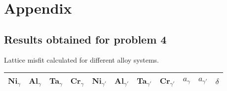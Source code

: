 \newpage
\section{Appendix}
\label{appendix}

\subsection{Results obtained for problem 4}

Lattice misfit calculated for different alloy systems. 

\begin{table}[H]
    \centering
    \begin{tabular}{rrrrrrrrrrr}
        \multicolumn{1}{c}{Ni$_\gamma$} & \multicolumn{1}{c}{Al$_\gamma$} & \multicolumn{1}{c}{Ta$_\gamma$} & \multicolumn{1}{c}{Cr$_\gamma$} & \multicolumn{1}{c}{Ni$_{\gamma'}$} & \multicolumn{1}{c}{Al$_{\gamma'}$} & \multicolumn{1}{c}{Ta$_{\gamma'}$} & \multicolumn{1}{c}{Cr$_{\gamma'}$} & \multicolumn{1}{c}{$a_\gamma$} & \multicolumn{1}{c}{$a_{\gamma'}$} & \multicolumn{1}{c}{$\delta$} \\ \hline \hline

\end{tabular}
\end{table}
